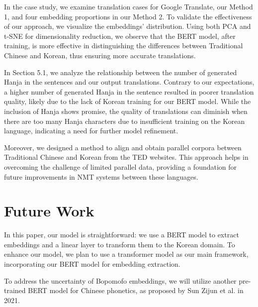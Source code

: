 \documentclass[PhD]{PHlab-thesis}
\begin{document}
In the case study, we examine translation cases for Google Translate, our Method 1, and four embedding proportions in our Method 2. To validate the effectiveness of our approach, we visualize the embeddings' distribution. Using both PCA and t-SNE for dimensionality reduction, we observe that the BERT model, after training, is more effective in distinguishing the differences between Traditional Chinese and Korean, thus ensuring more accurate translations.

In Section 5.1, we analyze the relationship between the number of generated Hanja in the sentences and our output translations. Contrary to our expectations, a higher number of generated Hanja in the sentence resulted in poorer translation quality, likely due to the lack of Korean training for our BERT model. While the inclusion of Hanja shows promise, the quality of translations can diminish when there are too many Hanja characters due to insufficient training on the Korean language, indicating a need for further model refinement.

Moreover, we designed a method to align and obtain parallel corpora between Traditional Chinese and Korean from the TED websites. This approach helps in overcoming the challenge of limited parallel data, providing a foundation for future improvements in NMT systems between these languages.

\section{Future Work}
In this paper, our model is straightforward: we use a BERT model to extract embeddings and a linear layer to transform them to the Korean domain. To enhance our model, we plan to use a transformer model as our main framework, incorporating our BERT model for embedding extraction.

To address the uncertainty of Bopomofo embeddings, we will utilize another pre-trained BERT model for Chinese phonetics, as proposed by Sun Zijun et al. in 2021.\cite{sun-etal-2021-chinesebert}

\newpage
{}
\printbibliography
\end{document}
